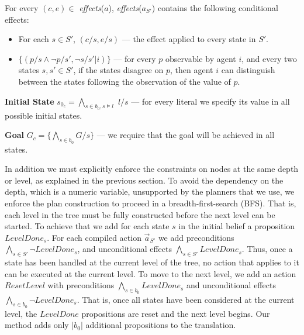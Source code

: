 \documentclass[letterpaper]{article}
\newcommand{\set}[1]{\{#1\}}
\theoremstyle{definition}
\begin{document}
For every $(c,e)\in $ \emph{effects}($a$), \emph{effects}($a_{S'}$) contains the following conditional effects:
\begin{itemize}
\setlength{\itemsep}{-1pt}
\item For each $s \in S'$, $(c/s,e/s)$ --- the effect applied to every state in $S'$.
\item $\set{(p/s \wedge \neg p/s' , \neg s/s'|i)}$ --- for every $p$ observable by agent $i$, and every two states $s,s'\in S'$, if the states disagree on $p$, then agent $i$ can distinguish between the states following the observation of the value of $p$.
\end{itemize}



{\bf Initial State} $s_{0_c} = \bigwedge_{s\in b_0,s\models l} $ $l/s$ --- for every literal we specify its value in all possible initial states.

{\bf Goal} $G_c = \{\bigwedge_{s \in b_0} G/s \}$ --- we require that the goal will be achieved in all states.

In addition we must explicitly enforce the constraints on nodes at the same depth or level, as explained in the previous section.
To avoid the dependency on the depth, which is a numeric variable, unsupported by the planners that we use, we enforce the plan construction to proceed in a breadth-first-search (BFS). That is, each level in the tree must be fully constructed before the next level can be started.
To achieve that we add for each state $s$ in the initial belief a proposition $LevelDone_s$. For each compiled action $\vec{a}_{S'}$ we add preconditions $\bigwedge_{s \in S'}\neg LevelDone_s$, and unconditional effects $\bigwedge_{s \in S'} LevelDone_s$. Thus, once a state has been handled at the current level of the tree, no action that applies to it can be executed at the current level.
To move to the next level, we add an action $ResetLevel$ with preconditions $\bigwedge_{s \in b_0}LevelDone_s$ and unconditional effects $\bigwedge_{s \in b_0}\neg LevelDone_s$. That is, once all states have been considered at the current level, the $LevelDone$ propositions are reset and the next level begins. Our method adds only $|b_0|$ additional propositions to the translation.
\end{document}
